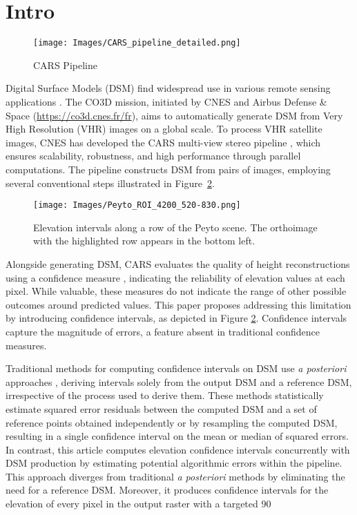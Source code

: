 \section{Intro}
\begin{figure}[b]
    \centering
    \texttt{[image: Images/CARS\_pipeline\_detailed.png]}
    \caption{CARS Pipeline}
    \label{fig:Cars_pipeline}
\end{figure}

Digital Surface Models (DSM) find widespread use in various remote sensing applications \cite{berthier_glacier_2014, deschamps-berger_apport_2021}. The CO3D mission, initiated by CNES and Airbus Defense & Space (\url{https://co3d.cnes.fr/fr}), aims to automatically generate DSM from Very High Resolution (VHR) images on a global scale. To process VHR satellite images, CNES has developed the CARS multi-view stereo pipeline \cite{michel_new_2020}, which ensures scalability, robustness, and high performance through parallel computations. The pipeline constructs DSM from pairs of images, employing several conventional steps illustrated in Figure~\ref{fig
}.

\begin{figure}[b]
\centering
\texttt{[image: Images/Peyto\_ROI\_4200\_520-830.png]}
\caption{Elevation intervals along a row of the Peyto scene. The orthoimage with the highlighted row appears in the bottom left.}
\label{fig
}
\end{figure}

Alongside generating DSM, CARS evaluates the quality of height reconstructions using a confidence measure \cite{sarrazin_ambiguity_2021}, indicating the reliability of elevation values at each pixel. While valuable, these measures do not indicate the range of other possible outcomes around predicted values. This paper proposes addressing this limitation by introducing confidence intervals, as depicted in Figure \ref{fig
}. Confidence intervals capture the magnitude of errors, a feature absent in traditional confidence measures.

Traditional methods for computing confidence intervals on DSM use \textit{a posteriori} approaches \cite{deschamps-berger_apport_2021, hugonnet_uncertainty_2022, wang_robust_2015}, deriving intervals solely from the output DSM and a reference DSM, irrespective of the process used to derive them. These methods statistically estimate squared error residuals between the computed DSM and a set of reference points obtained independently or by resampling the computed DSM, resulting in a single confidence interval on the mean or median of squared errors. In contrast, this article computes elevation confidence intervals concurrently with DSM production by estimating potential algorithmic errors within the pipeline. This approach diverges from traditional \textit{a posteriori} methods by eliminating the need for a reference DSM. Moreover, it produces confidence intervals for the elevation of every pixel in the output raster with a targeted 90%

